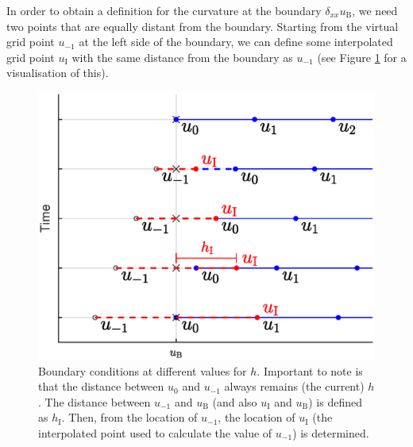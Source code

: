 \documentclass[dvipsnames]{article}
\begin{document}
In order to obtain a definition for the curvature at the boundary $\delta_{xx}u_\text{B}$, we need two points that are equally distant from the boundary. Starting from the virtual grid point $u_{-1}$ at the left side of the boundary, we can define some interpolated grid point $u_\text{I}$ with the same distance from the boundary as $u_{-1}$ (see Figure \ref{fig:dynamicBoundary} for a visualisation of this). 
\begin{figure}[h]
\centerline{\includegraphics[width=0.6\columnwidth]{dynamicBoundaryDrawChange.eps}}
\caption{\label{fig:dynamicBoundary}{Boundary conditions at different values for $h$. Important to note is that the distance between $u_0$ and $u_{-1}$ always remains (the current) $h$. The distance between $u_{-1}$ and $u_\text{B}$ (and also $u_\text{I}$ and $u_\text{B}$) is defined as $h_\text{I}$. Then, from the location of $u_{-1}$, the location of $u_\text{I}$ (the interpolated point used to calculate the value of $u_{-1}$) is determined.}}
\end{figure}
\end{document}
